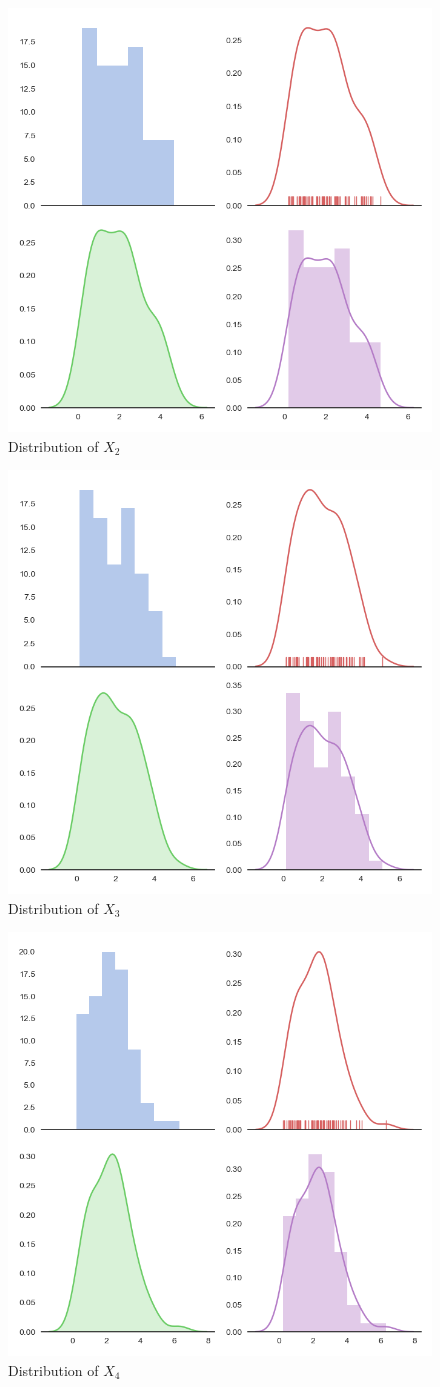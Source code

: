 \documentclass[10pt,journal]{IEEEtran}
\begin{document}
\begin{figure}[!ht]
	\centering
	\includegraphics[width=0.7\columnwidth,height=0.6\linewidth]{10_2.png}
	\caption{Distribution of \(X_2\)}
\end{figure}
\begin{figure}[!ht]
	\centering
	\includegraphics[width=0.7\columnwidth,height=0.6\linewidth]{10_3.png}
	\caption{Distribution of \(X_3\)}
\end{figure}
\begin{figure}[!ht]
\centering
\includegraphics[width=0.7\columnwidth,height=0.6\linewidth]{10_4.png}
\caption{Distribution of \(X_4\)}
\end{figure}
\end{document}
